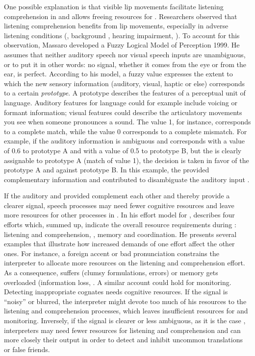 \documentclass[output=paper]{LSP/langsci}
\begin{document}
One possible explanation is that visible lip movements facilitate listening comprehension in  and allows freeing resources for . Researchers observed that listening comprehension benefits from lip movements, especially in adverse listening conditions (, background , hearing impairment, \citealt{Mattys2011, Kriegstein2008, Brancazio2006, Bernstein2004, Massaro2004}). To account for this observation, Massaro developed a Fuzzy Logical Model of Perception 1999. He assumes that neither auditory speech nor visual speech inputs are unambiguous, or to put it in other words: no signal, whether it comes from the eye or from the ear, is perfect. According to his model, a fuzzy value expresses the extent to which the new sensory information (auditory, visual, haptic or else) corresponds to a certain \textit{prototype}. A prototype describes the features of a perceptual unit of language. Auditory features for language could for example include voicing or formant information; visual features could describe the articulatory movements you see when someone pronounces a sound. The value 1, for instance, corresponds to a complete match, while the value 0 corresponds to a complete mismatch. For example, if the auditory information is ambiguous and corresponds with a value of 0.6 to prototype A and with a value of 0.5 to prototype B, but the  is clearly assignable to prototype A (match of value 1), the decision is taken in favor of the prototype A and against prototype B. In this example, the  provided complementary information and contributed to disambiguate the auditory input \citep{Massaro1999}.

If the auditory and  provided complement each other and thereby provide a clearer signal, speech  processes may need fewer cognitive resources and leave more resources for other processes in . In his effort model for , \citet{Gile2009} describes four efforts which, summed up, indicate the overall resource requirements during : listening and comprehension, , memory and coordination. He presents several examples that illustrate how increased demands of one effort affect the other ones. For instance, a foreign accent or bad pronunciation constrains the interpreter to allocate more resources on the listening and comprehension effort. As a consequence,  suffers (clumsy formulations, errors) or memory gets overloaded (information loss, \citealt[173]{Gile2009}. A similar account could hold for  monitoring. Detecting inappropriate cognates needs cognitive resources. If the signal is ``noisy'' or blurred, the interpreter might devote too much of his resources to the listening and comprehension processes, which leaves insufficient resources for  and monitoring. Inversely, if the signal is clearer or less ambiguous, as it is the case , interpreters may need fewer resources for listening and comprehension and can  more closely their output in order to detect and inhibit uncommon  translations or false friends. 
\end{document}
